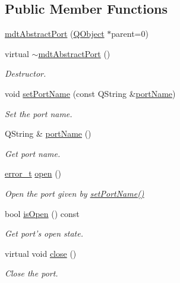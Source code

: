 \subsection*{Public Member Functions}
\begin{DoxyCompactItemize}
\item 
\hyperlink{classmdt_abstract_port_a35e7bff9413690833c832bf115da102f}{mdt\-Abstract\-Port} (\hyperlink{class_q_object}{Q\-Object} $\ast$parent=0)
\item 
virtual \hyperlink{classmdt_abstract_port_aa40baa0c593fef984f3796acafceee15}{$\sim$mdt\-Abstract\-Port} ()
\begin{DoxyCompactList}\small\item\em Destructor. \end{DoxyCompactList}\item 
void \hyperlink{classmdt_abstract_port_a0ca143d32fc677bac7c1cf0e04144932}{set\-Port\-Name} (const Q\-String \&\hyperlink{classmdt_abstract_port_ac52fbd121f7cbb848a2f3e5d29fae615}{port\-Name})
\begin{DoxyCompactList}\small\item\em Set the port name. \end{DoxyCompactList}\item 
Q\-String \& \hyperlink{classmdt_abstract_port_ac52fbd121f7cbb848a2f3e5d29fae615}{port\-Name} ()
\begin{DoxyCompactList}\small\item\em Get port name. \end{DoxyCompactList}\item 
\hyperlink{classmdt_abstract_port_ad4121bb930c95887e77f8bafa065a85e}{error\-\_\-t} \hyperlink{classmdt_abstract_port_a4e0f0b7f9e24257677184e4bde10fdde}{open} ()
\begin{DoxyCompactList}\small\item\em Open the port given by \hyperlink{classmdt_abstract_port_a0ca143d32fc677bac7c1cf0e04144932}{set\-Port\-Name()} \end{DoxyCompactList}\item 
bool \hyperlink{classmdt_abstract_port_a2122ae3141342ff38c8388e62b244e3b}{is\-Open} () const 
\begin{DoxyCompactList}\small\item\em Get port's open state. \end{DoxyCompactList}\item 
virtual void \hyperlink{classmdt_abstract_port_a1ace1a2bd1a04f16952980e247b04800}{close} ()
\begin{DoxyCompactList}\small\item\em Close the port. \end{DoxyCompactList}\item 

\end{DoxyCompactItemize}
